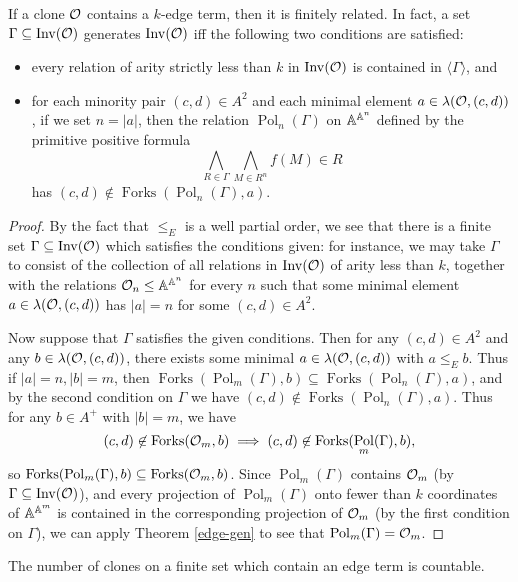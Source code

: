 \documentclass[letterpaper,11pt]{article}
\DeclareMathOperator{\Pol}{Pol}
\DeclareMathOperator{\Inv}{Inv}
\DeclareMathOperator{\Forks}{Forks}
\begin{document}
\begin{thm}\label{few-finite} If a clone $\mathcal{O}$ contains a $k$-edge term, then it is finitely related. In fact, a set $\Gamma \subseteq \Inv(\cO)$ generates $\Inv(\cO)$ iff the following two conditions are satisfied:
\begin{itemize}
\item every relation of arity strictly less than $k$ in $\Inv(\cO)$ is contained in $\langle \Gamma \rangle$, and
\item for each minority pair $(c,d) \in A^2$ and each minimal element $a \in \lambda(\mathcal{O},(c,d))$, if we set $n = |a|$, then the relation $\Pol_n(\Gamma)$ on $\mathbb{A}^{\mathbb{A}^n}$ defined by the primitive positive formula
\[
\bigwedge_{R \in \Gamma} \bigwedge_{M \in R^n} f(M) \in R
\]
has $(c,d) \not\in \Forks(\Pol_n(\Gamma),a)$.
\end{itemize}
\end{thm}
\begin{proof} By the fact that $\le_E$ is a well partial order, we see that there is a finite set $\Gamma \subseteq \Inv(\cO)$ which satisfies the conditions given: for instance, we may take $\Gamma$ to consist of the collection of all relations in $\Inv(\cO)$ of arity less than $k$, together with the relations $\mathcal{O}_n \le \mathbb{A}^{\mathbb{A}^n}$ for every $n$ such that some minimal element $a \in \lambda(\mathcal{O},(c,d))$ has $|a| = n$ for some $(c,d) \in A^2$.

Now suppose that $\Gamma$ satisfies the given conditions. Then for any $(c,d) \in A^2$ and any $b \in \lambda(\mathcal{O},(c,d))$, there exists some minimal $a \in \lambda(\mathcal{O},(c,d))$ with $a \le_E b$. Thus if $|a| = n, |b| = m$, then $\Forks(\Pol_m(\Gamma),b) \subseteq \Forks(\Pol_n(\Gamma),a)$, and by the second condition on $\Gamma$ we have $(c,d) \not\in \Forks(\Pol_n(\Gamma),a)$. Thus for any $b \in A^+$ with $|b| = m$, we have
\[
(c,d) \not\in \Forks(\cO_m,b) \implies (c,d) \not\in \Forks(\Pol_m(\Gamma),b),
\]
so $\Forks(\Pol_m(\Gamma),b) \subseteq \Forks(\cO_m,b)$. Since $\Pol_m(\Gamma)$ contains $\mathcal{O}_m$ (by $\Gamma \subseteq \Inv(\cO)$), and every projection of $\Pol_m(\Gamma)$ onto fewer than $k$ coordinates of $\mathbb{A}^{\mathbb{A}^m}$ is contained in the corresponding projection of $\mathcal{O}_m$ (by the first condition on $\Gamma$), we can apply Theorem \ref{edge-gen} to see that $\Pol_m(\Gamma) = \cO_m$.
\end{proof}

\begin{cor} The number of clones on a finite set which contain an edge term is countable.
\end{cor}
\end{document}
